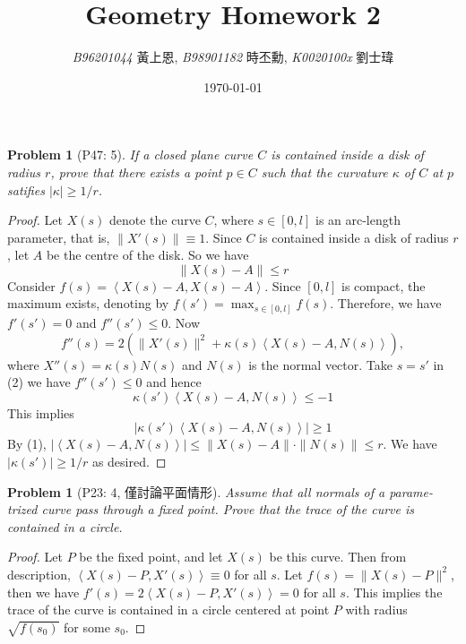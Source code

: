 \documentclass[10pt,a4paper]{article}
\newcommand{\LiHei}{\CJKfamily{lh}}
\newcounter{theProblemCounter}
\newtheorem{problem}[theProblemCounter]{Problem}
\begin{document}
\title{{Geometry Homework 2}}
\author{{\it{B96201044}} {\LiHei 黃上恩}, {\it{B98901182}} {\LiHei 時丕勳}, {\it{K0020100x}} {\LiHei 劉士瑋}}
\date{\today}
\maketitle

\setcounter{theProblemCounter}{2}
\begin{problem}[P47: 5]
If a closed plane curve $C$ is contained inside a disk of radius $r$, prove that there exists a point $p\in C$ such that the curvature $\kappa$ of $C$ at $p$ satifies $|\kappa|\ge 1/r$.
\end{problem}
\begin{proof}
Let $X(s)$ denote the curve $C$, where $s\in [0, l]$ is an arc-length parameter, that is, $\|X'(s)\|\equiv 1$. Since $C$ is contained inside a disk of radius $r$, let $A$ be the centre of the disk. So we have
\begin{equation} \|X(s)-A\|\le r\end{equation}
Consider $f(s)=\left\langle X(s)-A, X(s)-A\right\rangle$. Since $[0, l]$ is compact, the maximum exists, denoting by $f(s') = \max_{s\in[0,l]}f(s)$. Therefore, we have $f'(s')=0$ and $f''(s') \le 0$. Now 
\begin{equation}
	f''(s)=2\left(\|X'(s)\|^2+\kappa(s)\left\langle X(s)-A, N(s)\right\rangle\right),
\end{equation}
where $X''(s)=\kappa(s)N(s)$ and $N(s)$ is the normal vector. Take $s=s'$ in (2) we have $f''(s') \le 0$ and hence
\begin{equation}
\kappa(s')\left\langle X(s)-A, N(s)\right\rangle \le -1
\end{equation}
This implies
\begin{equation}
|\kappa(s')\left\langle X(s)-A, N(s)\right\rangle| \ge 1
\end{equation}
By (1), $|\left\langle X(s)-A, N(s)\right\rangle| \le \|X(s)-A\|\cdot \|N(s)\| \le r$. We have $|\kappa(s')|\ge 1/r$ as desired.
\end{proof}

\setcounter{theProblemCounter}{3}
\begin{problem}[P23: 4, 僅討論平面情形]
Assume that all normals of a parame-trized curve pass through a fixed point. Prove that the trace of the curve is contained in a circle.
\end{problem}
\begin{proof}
Let $P$ be the fixed point, and let $X(s)$ be this curve. Then from description, $\left\langle X(s)-P, X'(s)\right\rangle\equiv 0$ for all $s$. Let $f(s) = \|X(s)-P\|^2$, then we have $f'(s) = 2\left\langle X(s)-P, X'(s)\right\rangle = 0$ for all $s$. This implies the trace of the curve is contained in a circle centered at point $P$ with radius $\sqrt{f(s_0)}$ for some $s_0$.
\end{proof}
\end{document}
